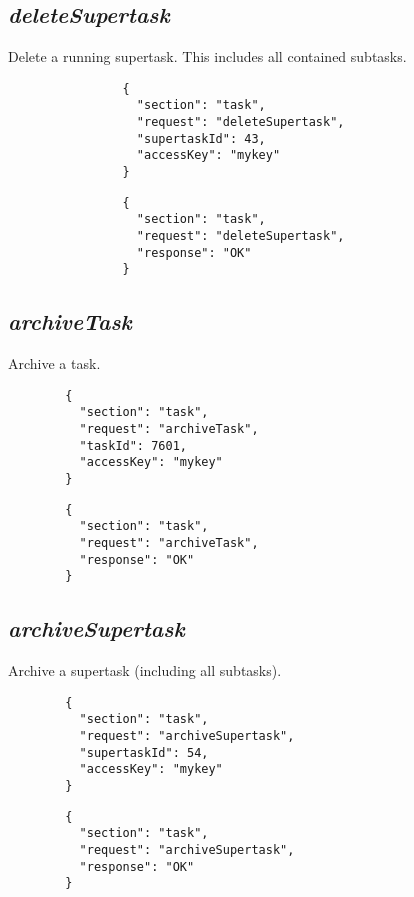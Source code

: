 		\subsection*{\textit{deleteSupertask}}
			Delete a running supertask. This includes all contained subtasks.
			{
				\color{blue}
				\begin{verbatim}
				{
				  "section": "task",
				  "request": "deleteSupertask",
				  "supertaskId": 43,
				  "accessKey": "mykey"
				}
				\end{verbatim}
			}
			{
				\color{OliveGreen}
				\begin{verbatim}
				{
				  "section": "task",
				  "request": "deleteSupertask",
				  "response": "OK"
				}
				\end{verbatim}
			}
\subsection*{\textit{archiveTask}}
	Archive a task.
	{
		\color{blue}
		\begin{verbatim}
		{
		  "section": "task",
		  "request": "archiveTask",
		  "taskId": 7601,
		  "accessKey": "mykey"
		}
		\end{verbatim}
	}
	{
		\color{OliveGreen}
		\begin{verbatim}
		{
		  "section": "task",
		  "request": "archiveTask",
		  "response": "OK"
		}
		\end{verbatim}
	}
\subsection*{\textit{archiveSupertask}}
	Archive a supertask (including all subtasks).
	{
		\color{blue}
		\begin{verbatim}
		{
		  "section": "task",
		  "request": "archiveSupertask",
		  "supertaskId": 54,
		  "accessKey": "mykey"
		}
		\end{verbatim}
	}
	{
		\color{OliveGreen}
		\begin{verbatim}
		{
		  "section": "task",
		  "request": "archiveSupertask",
		  "response": "OK"
		}
		\end{verbatim}
	}

